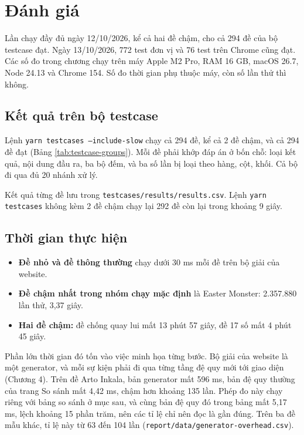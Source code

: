 \chapter{Đánh giá}

Lần chạy đầy đủ ngày 12/10/2026, kể cả hai đề chậm, cho cả 294 đề của bộ testcase đạt. Ngày 13/10/2026, 772 test đơn vị và 76 test trên Chrome cũng đạt. Các số đo trong chương chạy trên máy Apple M2 Pro, RAM 16 GB, macOS 26.7, Node 24.13 và Chrome 154. Số đo thời gian phụ thuộc máy, còn số lần thử thì không.

\section{Kết quả trên bộ testcase}

Lệnh \texttt{yarn testcases --include-slow} chạy cả 294 đề, kể cả 2 đề chậm, và cả 294 đề đạt (Bảng \ref{tab:testcase-groups}). Mỗi đề phải khớp đáp án ở bốn chỗ: loại kết quả, nội dung đầu ra, ba bộ đếm, và ba số lần bị loại theo hàng, cột, khối. Cả bộ đi qua đủ 20 nhánh xử lý.

Kết quả từng đề lưu trong \texttt{testcases/results/results.csv}. Lệnh \texttt{yarn testcases} không kèm 2 đề chậm chạy lại 292 đề còn lại trong khoảng 9 giây.

\section{Thời gian thực hiện}

\begin{itemize}
  \item \textbf{Đề nhỏ và đề thông thường} chạy dưới 30 ms mỗi đề trên bộ giải của website.
  \item \textbf{Đề chậm nhất trong nhóm chạy mặc định} là Easter Monster: 2.357.880 lần thử, 3,37 giây.
  \item \textbf{Hai đề chậm:} đề chống quay lui mất 13 phút 57 giây, đề 17 số mất 4 phút 45 giây.
\end{itemize}

Phần lớn thời gian đó tốn vào việc minh họa từng bước. Bộ giải của website là một generator, và mỗi sự kiện phải đi qua từng tầng đệ quy mới tới giao diện (Chương 4). Trên đề Arto Inkala, bản generator mất 596 ms, bản đệ quy thường của trang So sánh mất 4,42 ms, chậm hơn khoảng 135 lần. Phép đo này chạy riêng với bảng so sánh ở mục sau, và cùng bản đệ quy đó trong bảng mất 5,17 ms, lệch khoảng 15 phần trăm, nên các tỉ lệ chỉ nên đọc là gần đúng. Trên ba đề mẫu khác, tỉ lệ này từ 63 đến 104 lần (\texttt{report/data/generator-overhead.csv}).

